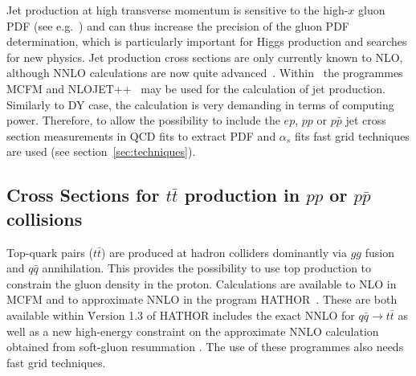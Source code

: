 Jet production at high transverse momentum is sensitive to the high-$x$ gluon 
PDF (see e.g.~\cite{MSTWpdf}) and can thus increase the precision of the 
gluon PDF determination, which is particularly important for Higgs production 
and searches for new physics.
Jet production cross sections are only currently known to NLO, although NNLO 
calculations are now quite advanced~\cite{nigel:2013,nigel:2010}. 
Within \fitter\ the programmes MCFM and 
NLOJET++~\cite{Nagy:1998bb,Nagy:2001fj} may be used for the 
calculation of jet production.
Similarly to DY case, the calculation 
is very demanding in terms of computing power. 
Therefore, to allow the possibility to include the $ep$, $pp$ or $p\bar p$ 
jet cross section 
measurements in QCD fits to extract PDF and $\alpha_s$ fits fast 
grid techniques are used (see section~\ref{sec:techniques}).




\subsection{Cross Sections for \texorpdfstring{$t\bar{t}$}{t-tbar} production in $pp$ or $p\bar p$ collisions}
%
Top-quark pairs ($t\bar{t}$) are produced at hadron colliders dominantly 
via $gg$ fusion and
$q \bar q$ annihilation. This provides the possibility to use top production to
constrain the gluon density in the proton. Calculations are available to NLO in MCFM and to approximate NNLO in the program HATHOR~\cite{Aliev:2010zk}. These are both available within \fitter\. 
Version 1.3 of HATHOR includes the exact NNLO for $q \bar q \to t \bar t$ \cite{Baernreuther:2012ws}
as well as a new high-energy constraint on the 
approximate NNLO calculation obtained from
soft-gluon resummation \cite{Moch:2012mk}.
The use of these programmes also needs fast grid techniques.




